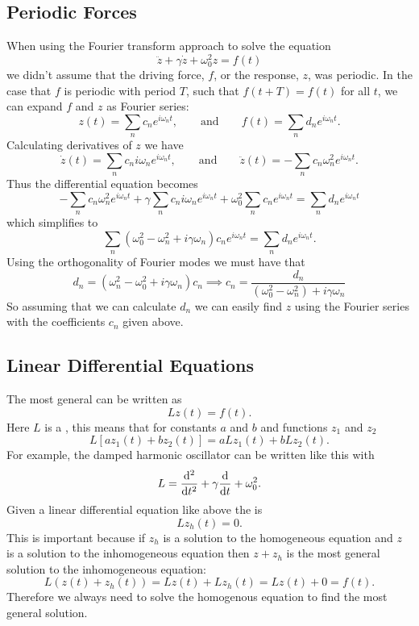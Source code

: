 \documentclass[a4paper]{article}
\begin{document}
    \subsection{Periodic Forces}
    When using the Fourier transform approach to solve the equation
    \[\ddot{z} + \gamma\dot{z} + \omega_0^2z = f(t)\]
    we didn't assume that the driving force, \(f\), or the response, \(z\), was periodic.
    In the case that \(f\) is periodic with period \(T\), such that \(f(t + T) = f(t)\) for all \(t\), we can expand \(f\) and \(z\) as Fourier series:
    \[z(t) = \sum_n c_ne^{i\omega_n t}, \qquad\text{and}\qquad f(t) = \sum_n d_ne^{i\omega_n t}.\]
    Calculating derivatives of \(z\) we have
    \[\dot{z}(t) = \sum_n c_n i\omega_n e^{i\omega_n t}, \qquad\text{and} \qquad \ddot{z}(t) = -\sum_n c_n\omega_n^2 e^{i\omega_n t}.\]
    Thus the differential equation becomes
    \[-\sum_n c_n\omega_n^2 e^{i\omega_n t} + \gamma \sum_n c_n i\omega_n e^{i\omega_n t} + \omega_0^2 \sum_n c_ne^{i\omega_n t} = \sum_n d_ne^{i\omega_n t}\]
    which simplifies to
    \[\sum_n (\omega_0^2 - \omega_n^2 + i\gamma\omega_n)c_n e^{i\omega_n t} = \sum_n d_n e^{i\omega_n t}.\]
    Using the orthogonality of Fourier modes we must have that
    \[d_n = (\omega_n^2 - \omega_0^2 + i\gamma\omega_n)c_n \implies c_n = \frac{d_n}{(\omega_0^2 - \omega_n^2) + i\gamma\omega_n}\]
    So assuming that we can calculate \(d_n\) we can easily find \(z\) using the Fourier series with the coefficients \(c_n\) given above.
    
    \subsection{Linear Differential Equations}
    The most general  can be written as
    \[Lz(t) = f(t).\]
    Here \(L\) is a , this means that for constants \(a\) and \(b\) and functions \(z_1\) and \(z_2\)
    \[L[az_1(t) + bz_2(t)] = aLz_1(t) + bLz_2(t).\]
    For example, the damped harmonic oscillator can be written like this with
    \[L = \dv[2]{t} + \gamma\dv{t} + \omega_0^2.\]
    Given a linear differential equation like above the  is
    \[Lz_h(t) = 0.\]
    This is important because if \(z_h\) is a solution to the homogeneous equation and \(z\) is a solution to the inhomogeneous equation then \(z + z_h\) is the most general solution to the inhomogeneous equation:
    \[L(z(t) + z_h(t)) = Lz(t) + Lz_h(t) = Lz(t) + 0 = f(t).\]
    Therefore we always need to solve the homogenous equation to find the most general solution.
    
\end{document}
